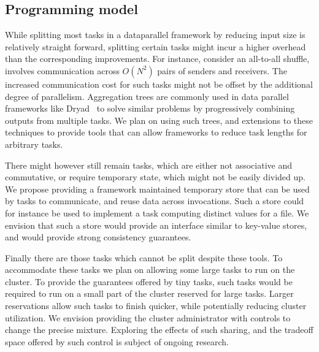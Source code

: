 \subsection{Programming model}
\label{sec:prog}
While splitting most tasks in a dataparallel framework by reducing input size 
is relatively straight forward, splitting certain tasks might incur a higher overhead 
than the corresponding improvements. For instance, consider an all-to-all shuffle, involves
communication across $O(N^2)$ pairs of senders and receivers. The increased communication cost
for such tasks might not be offset by the additional degree of parallelism. Aggregation trees are
commonly used in data parallel frameworks like Dryad~\cite{yu2008dryadlinq} to solve similar
problems by progressively combining outputs from multiple tasks. We plan on using such trees,
and extensions to these techniques to provide tools that can allow frameworks to reduce task
lengths for arbitrary tasks.

There might however still remain tasks, which are either not associative and commutative, or
require temporary state, which might not be easily divided up. We propose providing a 
framework maintained temporary store that can be used by tasks to communicate, and reuse data
across invocations. Such a store could for instance be used to implement a task computing distinct
values for a file. We envision that such a store would provide an interface similar to key-value
stores, and would provide strong consistency guarantees.

Finally there are those tasks which cannot be split despite these tools. To accommodate these 
tasks we plan on allowing some large tasks to run on the cluster. To provide the guarantees offered
by tiny tasks, such tasks would be required to run on a small part of the cluster reserved for large
tasks. Larger reservations allow such tasks to finish quicker, while potentially reducing cluster 
utilization. We envision providing the cluster administrator with controls to change the precise mixture.
Exploring the effects of such sharing, and the tradeoff space offered by such control is subject of ongoing research.

